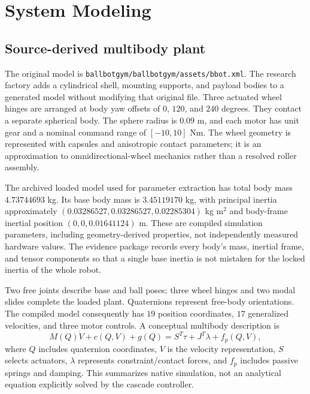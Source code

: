 \section{System Modeling}
\subsection{Source-derived multibody plant}
The original model is \texttt{ballbotgym/ballbotgym/assets/bbot.xml}. The research factory adds a cylindrical shell, mounting supports, and payload bodies to a generated model without modifying that original file. Three actuated wheel hinges are arranged at body yaw offsets of $0$, $120$, and $240$ degrees. They contact a separate spherical body. The sphere radius is $0.09$ m, and each motor has unit gear and a nominal command range of $[-10,10]$ Nm. The wheel geometry is represented with capsules and anisotropic contact parameters; it is an approximation to omnidirectional-wheel mechanics rather than a resolved roller assembly.

The archived loaded model used for parameter extraction has total body mass $4.73744693$ kg. Its base body mass is $3.45119170$ kg, with principal inertia approximately $(0.03286527,0.03286527,0.02285304)$ kg m$^2$ and body-frame inertial position $(0,0,0.01641124)$ m. These are compiled simulation parameters, including geometry-derived properties, not independently measured hardware values. The evidence package records every body's mass, inertial frame, and tensor components so that a single base inertia is not mistaken for the locked inertia of the whole robot.

Two free joints describe base and ball poses; three wheel hinges and two modal slides complete the loaded plant. Quaternions represent free-body orientations. The compiled model consequently has $19$ position coordinates, $17$ generalized velocities, and three motor controls. A conceptual multibody description is
\begin{equation}
 M(Q)\dot V+c(Q,V)+g(Q)=S^T\tau+J^T\lambda+f_p(Q,V),
\end{equation}
where $Q$ includes quaternion coordinates, $V$ is the velocity representation, $S$ selects actuators, $\lambda$ represents constraint/contact forces, and $f_p$ includes passive springs and damping. This summarizes native simulation, not an analytical equation explicitly solved by the cascade controller.


